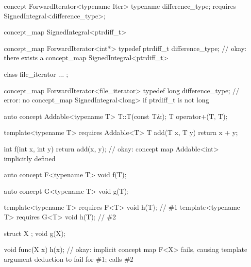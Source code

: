 \documentclass[american]{book}
\begin{document}
\begin{paras}
\begin{codeblock}
concept ForwardIterator<typename Iter> {
  typename difference_type;
  requires SignedIntegral<difference_type>;
}

concept_map SignedIntegral<ptrdiff_t> { }

concept_map ForwardIterator<int*> {
  typedef ptrdiff_t difference_type;
} // okay: there exists a concept_map SignedIntegral<ptrdiff_t>

class file_iterator { ... };

concept_map ForwardIterator<file_iterator> {
  typedef long difference_type;
} // error: no concept_map SignedIntegral<long> if ptrdiff_t is not long
\end{codeblock} 
\addedConcepts{\mbox{\exitexample}}

\pnum
{} 
\begin{codeblock}
auto concept Addable<typename T> {
  T::T(const T&);
  T operator+(T, T);
}

template<typename T>
requires Addable<T>
T add(T x, T y) {
  return x + y;
}

int f(int x, int y) {
  return add(x, y); // okay: concept map Addable<int> implicitly defined
}
\end{codeblock}
\addedConcepts{\mbox{\exitexample}}

\pnum
{}
\begin{codeblock}
auto concept F<typename T> {
  void f(T);
}

auto concept G<typename T> {
  void g(T);
}

template<typename T> requires F<T> void h(T); // \#1
template<typename T> requires G<T> void h(T); // \#2

struct X { };
void g(X);

void func(X x) {
  h(x); // okay: implicit concept map F<X> fails, causing template argument deduction to fail for \#1; calls \#2
}
\end{codeblock}
\addedConcepts{\mbox{\exitexample}}


\end{paras}
\end{document}
